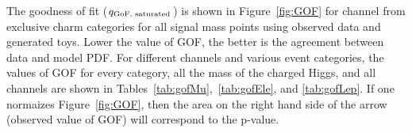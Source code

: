 The goodness of fit ($q_{\rm{GoF, saturated}}$) is shown in Figure~\ref{fig:GOF} for \ljets channel  
from exclusive charm categories for all signal mass points using observed data and generated toys. 
Lower the value of GOF, the better is the agreement between data and model PDF. For different 
channels and various event categories, the values of GOF for every category, all the mass of the 
charged Higgs, and all channels are shown in Tables~\ref{tab:gofMu},~\ref{tab:gofEle}, and 
\ref{tab:gofLep}. If one normaizes Figure~\ref{fig:GOF}, then the area on the right hand side of 
the arrow (observed value of GOF) will correspond to the p-value.
\begin{figure}
    \centering  
    \vfil

\end{figure}
